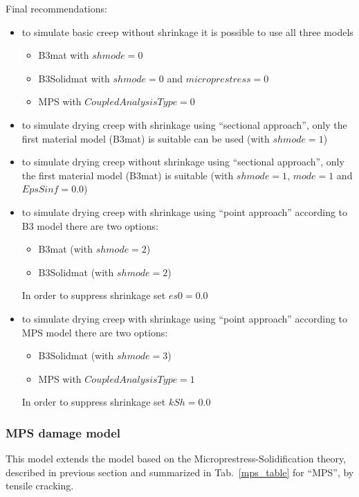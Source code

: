 \documentclass[a4paper]{article}
\begin{document}
Final recommendations:

\begin {itemize}
\item to simulate basic creep without shrinkage it is possible to use
  all three models
\begin {itemize}%
\item B3mat with $shmode = 0$
\item B3Solidmat with $shmode = 0$ and $microprestress = 0$
\item MPS with $CoupledAnalysisType = 0$
\end{itemize}
\item to simulate drying creep with shrinkage using ``sectional approach'', only the
  first material model (B3mat) is suitable can be used (with $shmode = 1$)

\item to simulate drying creep without shrinkage using ``sectional approach'', only the
  first material model (B3mat) is suitable (with $shmode = 1$, $mode = 1$
  and $EpsSinf = 0.0$)

\item to simulate drying creep with shrinkage using ``point approach''
  according to B3 model there are two options:
\begin {itemize} %
\item B3mat (with $shmode = 2$)
\item B3Solidmat (with $shmode = 2$)
\end{itemize}
In order to suppress shrinkage set $es0 = 0.0$

\item to simulate drying creep with shrinkage using ``point approach''
  according to MPS model there are two options:
\begin {itemize} %
\item B3Solidmat (with $shmode = 3$)
\item MPS with $CoupledAnalysisType = 1$
\end{itemize}
In order to suppress shrinkage set $kSh = 0.0$
\end{itemize}


\subsubsection{MPS damage model}

This model extends the model based on the Microprestress-Solidification theory, described in previous section and summarized in Tab.~\ref{mps_table} for ``MPS'', by tensile cracking.
\end{document}
